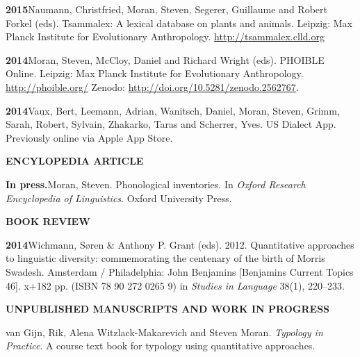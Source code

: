 \documentclass[11pt]{article}
\newcommand{\hangpara}{
 \setlength{\parindent}{0in} %
 \hangindent=0.42in %
}
\begin{document}
\vskip 6pt
\hangpara{\bf 2015}\hspace{1ex}Naumann, Christfried, Moran, Steven, Segerer, Guillaume and Robert Forkel (eds). 
Tsammalex: A lexical database on plants and animals. Leipzig: Max Planck Institute for Evolutionary Anthropology.  \url{http://tsammalex.clld.org}

\vskip 6pt
\hangpara{\bf 2014}\hspace{1ex}Moran, Steven, McCloy, Daniel and Richard Wright (eds). PHOIBLE Online. Leipzig: Max Planck Institute for Evolutionary Anthropology. \url{http://phoible.org/} Zenodo: \url{http://doi.org/10.5281/zenodo.2562767}.

\vskip 6pt
\hangpara{\bf 2014}\hspace{1ex}Vaux, Bert, Leemann, Adrian, Wanitsch, Daniel, Moran, Steven, Grimm, Sarah, Robert, Sylvain, Zhakarko, Taras and Scherrer, Yves. US Dialect App. Previously online via Apple App Store. %


\vskip 20pt
\begin{flushleft}
{\bf ENCYLOPEDIA ARTICLE}
\end{flushleft}

\hangpara
{\bf In press.}\hspace{1ex}Moran, Steven. Phonological inventories. In \textit{Oxford Research Encyclopedia of Linguistics}. Oxford University Press. 


\vskip 20pt
\begin{flushleft}
{\bf BOOK REVIEW}
\end{flushleft}


\hangpara
{\bf 2014}\hspace{1ex}Wichmann, S{\o}ren \& Anthony P. Grant (eds). 2012. Quantitative approaches to linguistic diversity: commemorating the centenary of the birth of Morris Swadesh. Amsterdam / Philadelphia: John Benjamins [Benjamins Current Topics 46]. x+182 pp. (ISBN 78 90 272 0265 9) in \textit{Studies in Language} 38(1), 220--233.

\vskip 20pt
\begin{flushleft}
{\bf UNPUBLISHED MANUSCRIPTS AND WORK IN PROGRESS}
\end{flushleft}

\hangpara
van Gijn, Rik, Alena Witzlack-Makarevich and Steven Moran. {\it Typology in Practice}. A course text book for typology using quantitative approaches.
\end{document}
